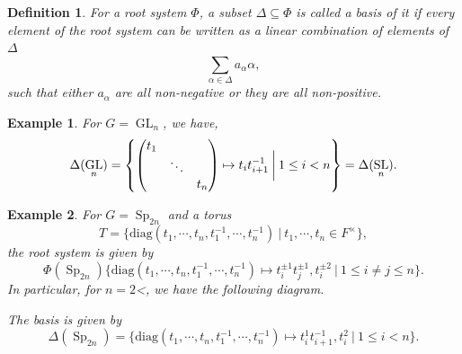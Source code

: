 \documentclass[10pt]{article}
\newtheorem{definition}{Definition}[section]
\newtheorem{example}{Example}[section]
\numberwithin{equation}{theorem}
\DeclareMathOperator{\GL}{GL}
\DeclareMathOperator{\SL}{SL}
\DeclareMathOperator{\Sp}{Sp}
\newcommand{\sep}[0]{\:|\:}
\begin{document}
\begin{definition}
    \label{definition_2_1}
    For a root system $\Phi$, a subset $\Delta\subseteq\Phi$ is called a basis of it if every element of the root system can be written as a linear combination of elements of $\Delta$ 
    \begin{equation*}
        \sum_{\alpha\in\Delta}a_{\alpha}\alpha,
    \end{equation*}
    such that either $a_{\alpha}$ are all non-negative or they are all non-positive.
\end{definition}

\begin{example}
    For $G = \GL_n$, we have,
    \begin{equation*}
        \Delta(\GL_n) = \left\{\begin{pmatrix}
            t_1 &\: &\: \\
            \: & \ddots &\:\\
            \: & \: & t_n
        \end{pmatrix}
        \mapsto t_it_{i+1}^{-1}\:\bigg{\vert}\: 1\leq i< n\right\} = \Delta(\SL_n).
    \end{equation*}
\end{example}

\begin{example}
    For $G=\Sp_{2n}$ and a torus 
    \begin{equation*}
        T = \{\mathrm{diag}(t_1,\cdots,t_n,t^{-1}_1,\cdots,t_n^{-1})\sep t_1,\cdots,t_n\in F^\times\},
    \end{equation*}
    the root system is given by 
    \begin{equation*}
        \Phi(\Sp_{2n}) \{\mathrm{diag}(t_1,\cdots,t_n,t^{-1}_1,\cdots,t_n^{-1})\mapsto t_i^{\pm1}t_j^{\pm 1},t_i^{\pm2}\sep 1\leq i\not=j\leq n\}.
    \end{equation*}
    In particular, for $n=2$<, we have the following diagram.
    \begin{center}
    \end{center}
    The basis is given by 
    \begin{equation*}
        \Delta(\Sp_{2n}) = \{\mathrm{diag}(t_1,\cdots,t_n,t^{-1}_1,\cdots,t_n^{-1})\mapsto t_i^{1}t_{i+1}^{- 1},t_i^{2}\sep 1\leq i<n\}.
    \end{equation*}
\end{example}
\end{document}
